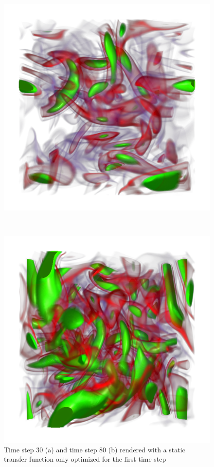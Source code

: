 \begin{figure}
	\centering
	\begin{minipage}{.49\textwidth}
		\includegraphics[width=1\linewidth]{images/vorts30_static}
		\subcaption{}
	\end{minipage}~
	\begin{minipage}{.49\textwidth}
		\includegraphics[width=1\linewidth]{images/vorts80_static}
		\subcaption{}
	\end{minipage}
	\caption{Time step 30 (a) and time step 80 (b) rendered with a static transfer function only optimized for the first time step}
	\label{fig:vorts_50_80_static}
\end{figure}

